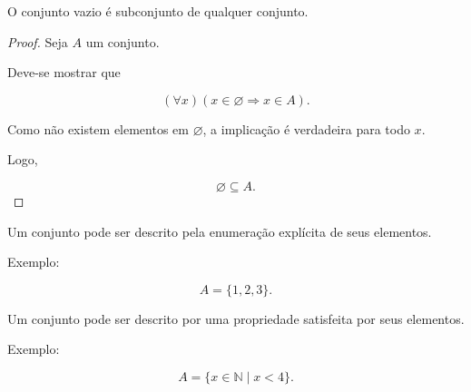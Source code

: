 \documentclass[../../main]{subfiles}
\begin{document}
\begin{prop}
	\label{prop:matematica:teoria-conjuntos:fundamentos:vazio-subconjunto}

	O conjunto vazio é subconjunto de qualquer conjunto.
\end{prop}

\begin{proof}

	Seja \(A\) um conjunto.

	Deve-se mostrar que

	\[
		(\forall x)
		(x \in \varnothing \Rightarrow x \in A).
	\]

	Como não existem elementos em \(\varnothing\), a implicação é
	verdadeira para todo \(x\).

	Logo,

	\[
		\varnothing \subseteq A.
	\]

\end{proof}

\begin{defn}
	\label{def:matematica:teoria-conjuntos:fundamentos:extensao}

	Um conjunto pode ser descrito pela enumeração explícita de seus
	elementos.

	Exemplo:

	\[
		A = \{1,2,3\}.
	\]
\end{defn}

\begin{defn}
	\label{def:matematica:teoria-conjuntos:fundamentos:compreensao}

	Um conjunto pode ser descrito por uma propriedade satisfeita por seus
	elementos.

	Exemplo:

	\[
		A =
		\{
		x \in \mathbb{N}
		\mid
		x < 4
		\}.
	\]
\end{defn}
\end{document}
